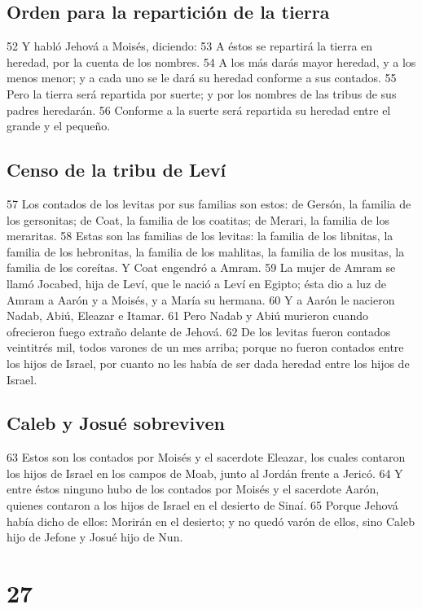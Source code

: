 \section*{Orden para la repartición de la tierra }

52 Y habló Jehová a Moisés, diciendo:
53 A éstos se repartirá la tierra en heredad, por la cuenta de los nombres.
54 A los más darás mayor heredad, y a los menos menor; y a cada uno se le dará su heredad conforme a sus contados.
55 Pero la tierra será repartida por suerte; y por los nombres de las tribus de sus padres heredarán.
56 Conforme a la suerte será repartida su heredad entre el grande y el pequeño.

\section*{Censo de la tribu de Leví}

57 Los contados de los levitas por sus familias son estos: de Gersón, la familia de los gersonitas; de Coat, la familia de los coatitas; de Merari, la familia de los meraritas.
58 Estas son las familias de los levitas: la familia de los libnitas, la familia de los hebronitas, la familia de los mahlitas, la familia de los musitas, la familia de los coreítas. Y Coat engendró a Amram.
59 La mujer de Amram se llamó Jocabed, hija de Leví, que le nació a Leví en Egipto; ésta dio a luz de Amram a Aarón y a Moisés, y a María su hermana.
60 Y a Aarón le nacieron Nadab, Abiú, Eleazar e Itamar. 
61 Pero Nadab y Abiú murieron cuando ofrecieron fuego extraño delante de Jehová.
62 De los levitas fueron contados veintitrés mil, todos varones de un mes arriba; porque no fueron contados entre los hijos de Israel, por cuanto no les había de ser dada heredad entre los hijos de Israel.

\section*{Caleb y Josué sobreviven}

63 Estos son los contados por Moisés y el sacerdote Eleazar, los cuales contaron los hijos de Israel en los campos de Moab, junto al Jordán frente a Jericó.
64 Y entre éstos ninguno hubo de los contados por Moisés y el sacerdote Aarón, quienes contaron a los hijos de Israel en el desierto de Sinaí.
65 Porque Jehová había dicho de ellos: Morirán en el desierto; y no quedó varón de ellos, sino Caleb hijo de Jefone y Josué hijo de Nun. 

\chapter{27}

